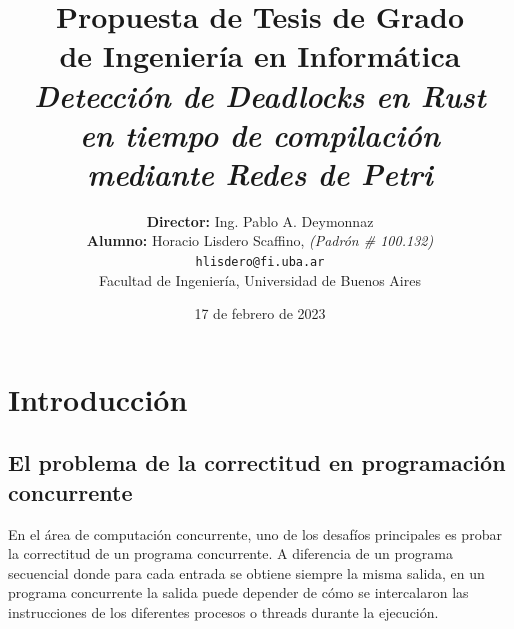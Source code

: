 \documentclass[12pt]{article}
\begin{document}
\begin{titlepage}

    \title{     \textbf{Propuesta de Tesis de Grado \\ de Ingeniería en Informática}\\[2.5ex]
        \textit{Detección de Deadlocks en Rust \\en tiempo de compilación \\mediante Redes de Petri} }

    \author{
        \textbf{Director:} Ing. Pablo A. Deymonnaz\\[2.5ex]
        \textbf{Alumno:} Horacio Lisdero Scaffino, \textit{(Padrón \# 100.132)}                                \\
        \texttt{ hlisdero@fi.uba.ar }                                    \\[2.5ex]
        \normalsize{Facultad de Ingeniería, Universidad de Buenos Aires}        \\
    }

    \date{17 de febrero de 2023}

\end{titlepage}

\maketitle
\thispagestyle{empty}

\maketitle{
    \hypersetup{linkcolor=black}
    \tableofcontents
}

\section{Introducción}

\subsection{El problema de la correctitud en programación concurrente}

En el área de computación concurrente, uno de los desafíos principales es probar la correctitud de un programa concurrente.
A diferencia de un programa secuencial donde para cada entrada se obtiene siempre la misma salida, en un programa concurrente
la salida puede depender de cómo se intercalaron las instrucciones de los diferentes procesos o threads durante la ejecución.
\end{document}
